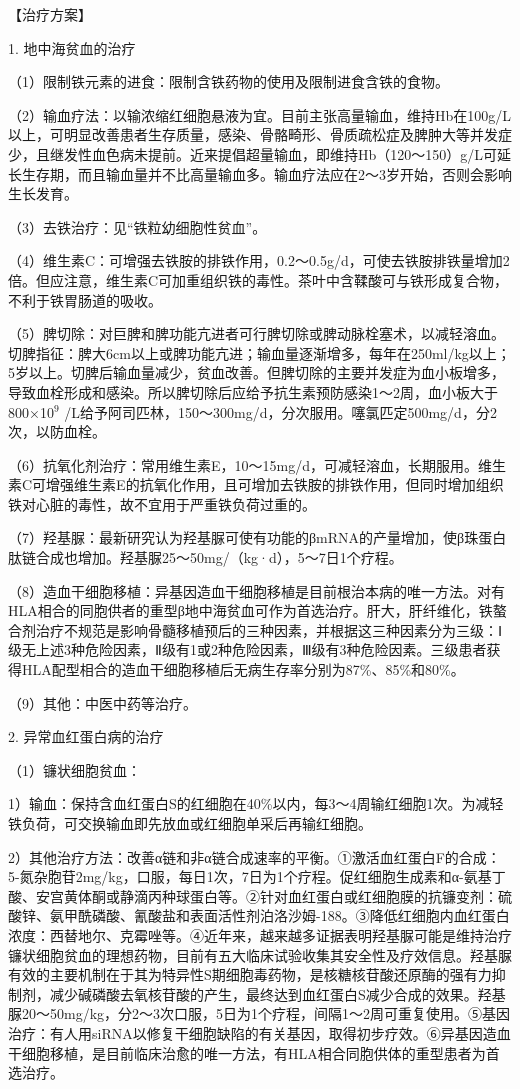 【治疗方案】

1. 地中海贫血的治疗

（1）限制铁元素的进食：限制含铁药物的使用及限制进食含铁的食物。

（2）输血疗法：以输浓缩红细胞悬液为宜。目前主张高量输血，维持Hb在100g/L以上，可明显改善患者生存质量，感染、骨骼畸形、骨质疏松症及脾肿大等并发症少，且继发性血色病未提前。近来提倡超量输血，即维持Hb（120～150）g/L可延长生存期，而且输血量并不比高量输血多。输血疗法应在2～3岁开始，否则会影响生长发育。

（3）去铁治疗：见“铁粒幼细胞性贫血”。

（4）维生素C：可增强去铁胺的排铁作用，0.2～0.5g/d，可使去铁胺排铁量增加2倍。但应注意，维生素C可加重组织铁的毒性。茶叶中含鞣酸可与铁形成复合物，不利于铁胃肠道的吸收。

（5）脾切除：对巨脾和脾功能亢进者可行脾切除或脾动脉栓塞术，以减轻溶血。切脾指征：脾大6cm以上或脾功能亢进；输血量逐渐增多，每年在250ml/kg以上；5岁以上。切脾后输血量减少，贫血改善。但脾切除的主要并发症为血小板增多，导致血栓形成和感染。所以脾切除后应给予抗生素预防感染1～2周，血小板大于800×10$^{9}$
/L给予阿司匹林，150～300mg/d，分次服用。噻氯匹定500mg/d，分2次，以防血栓。

（6）抗氧化剂治疗：常用维生素E，10～15mg/d，可减轻溶血，长期服用。维生素C可增强维生素E的抗氧化作用，且可增加去铁胺的排铁作用，但同时增加组织铁对心脏的毒性，故不宜用于严重铁负荷过重的。

（7）羟基脲：最新研究认为羟基脲可使有功能的βmRNA的产量增加，使β珠蛋白肽链合成也增加。羟基脲25～50mg/（kg·d），5～7日1个疗程。

（8）造血干细胞移植：异基因造血干细胞移植是目前根治本病的唯一方法。对有HLA相合的同胞供者的重型β地中海贫血可作为首选治疗。肝大，肝纤维化，铁螯合剂治疗不规范是影响骨髓移植预后的三种因素，并根据这三种因素分为三级：Ⅰ级无上述3种危险因素，Ⅱ级有1或2种危险因素，Ⅲ级有3种危险因素。三级患者获得HLA配型相合的造血干细胞移植后无病生存率分别为87\%、85\%和80\%。

（9）其他：中医中药等治疗。

2. 异常血红蛋白病的治疗

（1）镰状细胞贫血：

1）输血：保持含血红蛋白S的红细胞在40\%以内，每3～4周输红细胞1次。为减轻铁负荷，可交换输血即先放血或红细胞单采后再输红细胞。

2）其他治疗方法：改善α链和非α链合成速率的平衡。①激活血红蛋白F的合成：5-氮杂胞苷2mg/kg，口服，每日1次，7日为1个疗程。促红细胞生成素和α-氨基丁酸、安宫黄体酮或静滴丙种球蛋白等。②针对血红蛋白或红细胞膜的抗镰变剂：硫酸锌、氨甲酰磷酸、氰酸盐和表面活性剂泊洛沙姆-188。③降低红细胞内血红蛋白浓度：西替地尔、克霉唑等。④近年来，越来越多证据表明羟基脲可能是维持治疗镰状细胞贫血的理想药物，目前有五大临床试验收集其安全性及疗效信息。羟基脲有效的主要机制在于其为特异性S期细胞毒药物，是核糖核苷酸还原酶的强有力抑制剂，减少碱磷酸去氧核苷酸的产生，最终达到血红蛋白S减少合成的效果。羟基脲20～50mg/kg，分2～3次口服，5日为1个疗程，间隔1～2周可重复使用。⑤基因治疗：有人用siRNA以修复干细胞缺陷的有关基因，取得初步疗效。⑥异基因造血干细胞移植，是目前临床治愈的唯一方法，有HLA相合同胞供体的重型患者为首选治疗。

